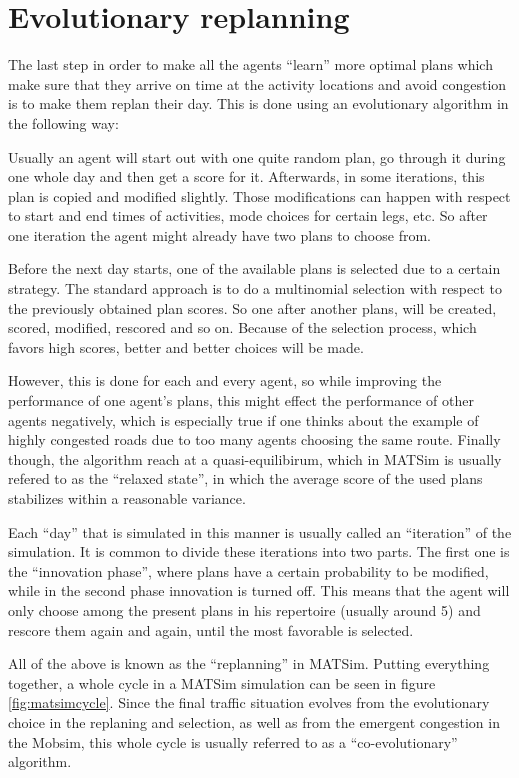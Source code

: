 \section{Evolutionary replanning}

The last step in order to make all the agents ``learn'' more optimal plans which
make sure that they arrive on time at the activity locations and avoid congestion
is to make them replan their day. This is done using an evolutionary algorithm in
the following way:

Usually an agent will start out with one quite random plan, go through it during
one whole day and then get a score for it. Afterwards, in some iterations, this
plan is copied and modified slightly. Those modifications can happen with respect
to start and end times of activities, mode choices for certain legs, etc. So after
one iteration the agent might already have two plans to choose from.

Before the next day starts, one of the available plans is selected due to a certain
strategy. The standard approach is to do a multinomial selection with respect to
the previously obtained plan scores. So one after another plans, will be created,
scored, modified, rescored and so on. Because of the selection process, which
favors high scores, better and better choices will be made.

However, this is done for each and every agent, so while improving the performance
of one agent's plans, this might effect the performance of other agents negatively,
which is especially true if one thinks about the example of highly congested roads
due to too many agents choosing the same route. Finally though, the algorithm reach
at a quasi-equilibirum, which in MATSim is usually refered to as the ``relaxed
state'', in which the average score of the used plans stabilizes within a
reasonable variance.

Each ``day'' that is simulated in this manner is usually called an ``iteration''
of the simulation. It is common to divide these iterations into two parts. The
first one is the ``innovation phase'', where plans have a certain probability to
be modified, while in the second phase innovation is turned off. This means that
the agent will only choose among the present plans in his repertoire (usually
around 5) and rescore them again and again, until the most favorable is selected.

All of the above is known as the ``replanning'' in MATSim. Putting everything
together, a whole cycle in a MATSim simulation can be seen in figure \ref{fig:matsimcycle}. Since the
final traffic situation evolves from the evolutionary choice in the replaning and
selection, as well as from the emergent congestion in the Mobsim, this whole
cycle is usually referred to as a ``co-evolutionary'' algorithm.

